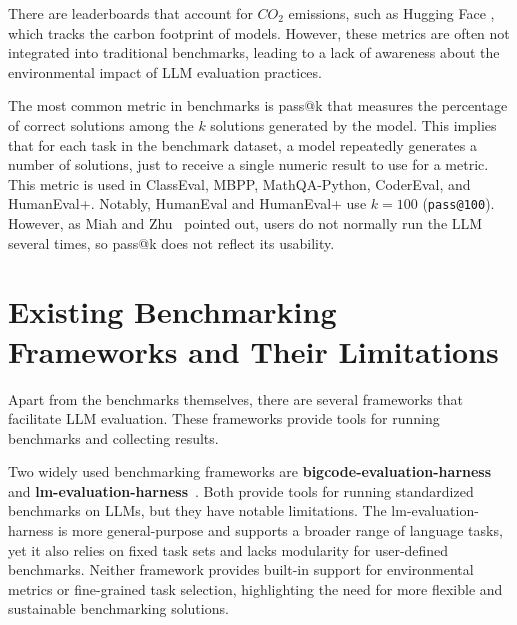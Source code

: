 There are leaderboards that account for $CO_2$ emissions, such as Hugging Face \cite{huggingfaceCalculation}, which tracks the carbon footprint of models. However, these metrics are often not integrated into traditional benchmarks, leading to a lack of awareness about the environmental impact of LLM evaluation practices.

The most common metric in benchmarks is pass@k that measures the percentage of correct solutions among the $k$ solutions generated by the model.
This implies that for each task in the benchmark dataset, a model repeatedly generates a number of solutions, just to receive a single numeric result to use for a metric.
This metric is used in ClassEval, MBPP, MathQA-Python, CoderEval, and HumanEval+.
Notably, HumanEval and HumanEval+ use $k=100$ (\texttt{pass@100}).
However, as Miah and Zhu~\cite{miah2024usercentricevaluationcode} pointed out, users do not normally run the LLM several times, so pass@k does not reflect its usability.

\section{Existing Benchmarking Frameworks and Their Limitations}


Apart from the benchmarks themselves, there are several frameworks that facilitate LLM evaluation.
These frameworks provide tools for running benchmarks and collecting results.

Two widely used benchmarking frameworks are \textbf{bigcode-evaluation-harness}~\cite{githubGitHubBigcodeprojectbigcodeevaluationharness} and \textbf{lm-evaluation-harness}~\cite{githubGitHubEleutherAIlmevaluationharness}.
Both provide tools for running standardized benchmarks on LLMs, but they have notable limitations.
The lm-evaluation-harness is more general-purpose and supports a broader range of language tasks, yet it also relies on fixed task sets and lacks modularity for user-defined benchmarks.
Neither framework provides built-in support for environmental metrics or fine-grained task selection, highlighting the need for more flexible and sustainable benchmarking solutions.


